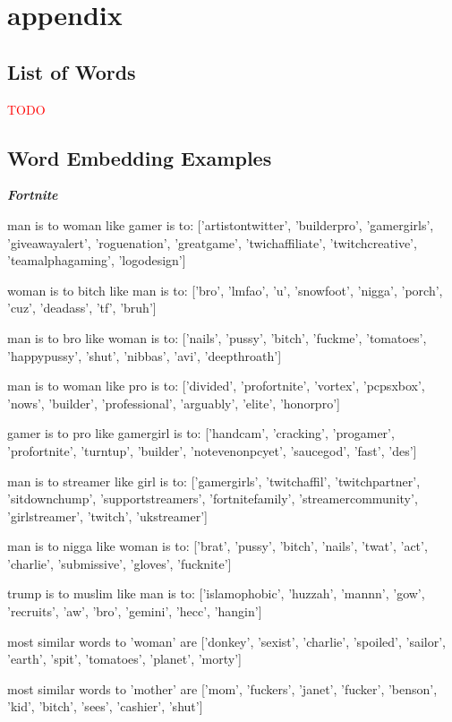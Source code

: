 \section{appendix}  \label{appendix}

\subsection{List of Words} \label{appendix:wordslists}
\textcolor{red}{TODO}


\subsection{Word Embedding Examples}
\textbf{\emph{Fortnite}}

man is to woman like gamer is to: 
['artistontwitter', 'builderpro', 'gamergirls', 'giveawayalert', 'roguenation', 'greatgame', 'twichaffiliate', 'twitchcreative', 'teamalphagaming', 'logodesign']

woman is to bitch like man is to: ['bro', 'lmfao', 'u', 'snowfoot', 'nigga', 'porch', 'cuz', 'deadass', 'tf', 'bruh']

man is to bro like woman is to: ['nails', 'pussy', 'bitch', 'fuckme', 'tomatoes', 'happypussy', 'shut', 'nibbas', 'avi', 'deepthroath']

man is to woman like pro is to: ['divided', 'profortnite', 'vortex', 'pcpsxbox', 'nows', 'builder', 'professional', 'arguably', 'elite', 'honorpro']

gamer is to pro like gamergirl is to: ['handcam', 'cracking', 'progamer', 'profortnite', 'turntup', 'builder', 'notevenonpcyet', 'saucegod', 'fast', 'des']

man is to streamer like girl is to: ['gamergirls', 'twitchaffil', 'twitchpartner', 'sitdownchump', 'supportstreamers', 'fortnitefamily', 'streamercommunity', 'girlstreamer', 'twitch', 'ukstreamer']

man is to nigga like woman is to: ['brat', 'pussy', 'bitch', 'nails', 'twat', 'act', 'charlie', 'submissive', 'gloves', 'fucknite']


trump is to muslim like man is to: ['islamophobic', 'huzzah', 'mannn', 'gow', 'recruits', 'aw', 'bro', 'gemini', 'hecc', 'hangin']

most similar words to 'woman' are ['donkey', 'sexist', 'charlie', 'spoiled', 'sailor', 'earth', 'spit', 'tomatoes', 'planet', 'morty']

most similar words to 'mother' are ['mom', 'fuckers', 'janet', 'fucker', 'benson', 'kid', 'bitch', 'sees', 'cashier', 'shut']

